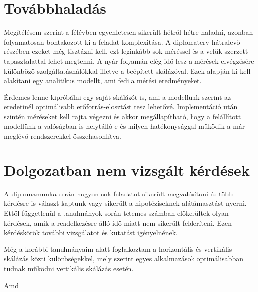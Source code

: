 \section{Továbbhaladás}
Megítélésem szerint a félévben egyenletesen sikerült hétről-hétre haladni, azonban folyamatosan bontakozott ki a feladat komplexitása.
A diplomaterv hátralevő részében ezeket még tisztázni kell, ezt leginkább sok méréssel és a velük szerzett tapasztalattal lehet megtenni. 
A nyár folyamán elég idő lesz a mérések elvégzésére különböző szolgáltatáshálókkal illetve a beépített skálázóval. 
Ezek alapján ki kell alakítani egy analitikus modellt, ami fedi a mérési eredményeket. 

Érdemes lenne kipróbálni egy saját skálázót is, ami a modellünk szerint az eredetinél optimálisabb erőforrás-elosztást tesz lehetővé.
Implementáció után szintén méréseket kell rajta végezni és akkor megállapítható, hogy a felállított modellünk a valóságban is helytálló-e és milyen hatékonysággal működik a már meglévő rendszerekkel összehasonlítva. 

\section{Dolgozatban nem vizsgált kérdések}
A diplomamunka során nagyon sok feladatot sikerült megvalósítani és több kérdésre is választ kaptunk vagy sikerült a hipotéziseknek alátámasztást nyerni.
Ettől függetlenül a tanulmányok során tetemes számban előkerültek olyan kérdések, amik a rendelkezésre álló idő miatt nem sikerült felderíteni.
Ezen kérdéskörök további vizsgálatot és kutatást igényelnének.

Még a korábbi tanulmányaim alatt foglalkoztam a horizontális és vertikális skálázás közti különbségekkel, mely szerint egyes alkalmazások optimálisabban tudnak működni vertikális skálázás esetén.

Amd